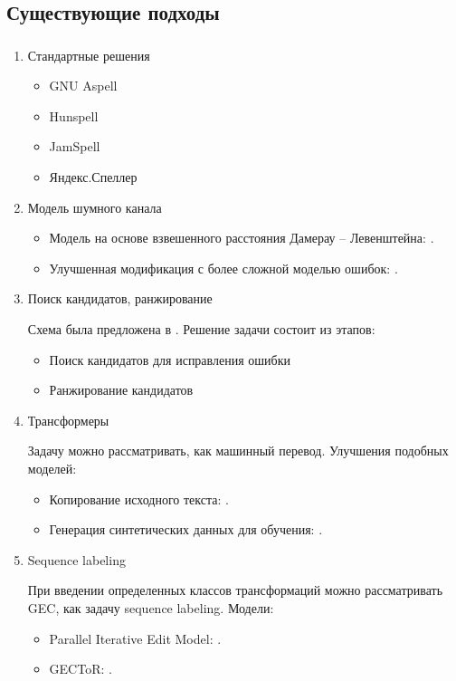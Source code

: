 \documentclass[t]{beamer}  %
\begin{document}
\subsection{Существующие подходы}
\begin{frame}[allowframebreaks]
	\frametitle{\insertsection} 
	\framesubtitle{\insertsubsection}
	\begin{enumerate}
		\item Стандартные решения
		\begin{itemize}
			\item GNU Aspell
			\item Hunspell
			\item JamSpell
			\item Яндекс.Спеллер
			
		\end{itemize}
		\item Модель шумного канала
			\begin{itemize}
				\item Модель на основе взвешенного расстояния Дамерау -- Левенштейна: \textcite{Kernighan1990}.
				\item Улучшенная модификация с более сложной моделью ошибок: \textcite{Brill2000}. 
			\end{itemize}
		
		\item Поиск кандидатов, ранжирование
		
		Схема была предложена в \textcite{Flor2012}. Решение задачи состоит из этапов:
		\begin{itemize}
			\item Поиск кандидатов для исправления ошибки
			\item Ранжирование кандидатов
		\end{itemize}
	
		\item Трансформеры
		
		Задачу можно рассматривать, как машинный перевод. Улучшения подобных моделей:
		\begin{itemize}
			\item Копирование исходного текста: \textcite{Zhao2019}.
			\item Генерация синтетических данных для обучения: \textcite{Kiyono2020}.
		\end{itemize}
	
		\item Sequence labeling
		
		При введении определенных классов трансформаций можно рассматривать GEC, как задачу sequence labeling. Модели:
		\begin{itemize}
			\item Parallel Iterative Edit Model: \textcite{Awasthi2020}.
			\item GECToR: \textcite{Omelianchuk2020}.
		\end{itemize}

	\end{enumerate}
\end{frame}
\end{document}
